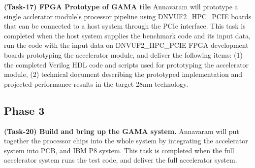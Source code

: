\vspace{3pt}
\noindent
\textbf{(Task-17) FPGA Prototype of GAMA tile}
 Annavaram will prototype a single acclerator module's processor pipeline using DNVUF2\_HPC\_PCIE boards that can be connected to a host system through the PCIe interface.
This task is completed when the host system supplies the benchmark code and its input data, run the code with the input data on DNVUF2\_HPC\_PCIE FPGA development boards prototyping the accelerator module, and deliver the following items:
(1) the completed Verilog HDL code and scripts used for prototyping the accelerator module,  
(2) technical document describing the prototyped implementation and projected performance results in the target 28nm technology.

\subsection{Phase 3}

\vspace{3pt}
\noindent
\textbf{(Task-20) Build and bring up the GAMA system.}
Annavaram will put together the processor chips into the whole system by integrating the accelerator system into PCB, and IBM P8 system.
This task is completed when the full accelerator system runs the test code, and deliver the full accelerator system.



